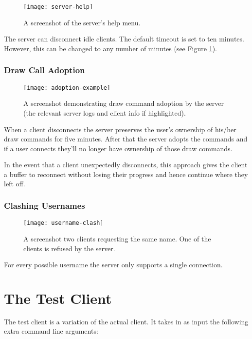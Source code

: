 \documentclass[article]{uom-coursework}
\begin{document}
\begin{figure}[H]
\centering
\texttt{[image: server-help]}
\caption{A screenshot of the server's help menu.}
\label{fig:serverhelp}
\end{figure}

The server can disconnect idle clients. The default timeout is
set to ten minutes. However, this can be changed to any number
of minutes (see Figure \ref{fig:serverhelp}).

\subsubsection{Draw Call Adoption}

\begin{figure}[H]
\centering
\texttt{[image: adoption-example]}
\caption{A screenshot demonstrating draw command adoption by the
server (the relevant server logs and client info if
highlighted).}
\label{fig:useradoption}
\end{figure}

When a client disconnects the server preserves the user's
ownership of his/her draw commands for five minutes. After
that the server adopts the commands and if a user connects
they'll no longer have ownership of those draw commands.

In the event that a client unexpectedly disconnects, this
approach gives the client a buffer to reconnect without losing
their progress and hence continue where they left off.

\subsubsection{Clashing Usernames}

\begin{figure}[H]
\centering
\texttt{[image: username-clash]}
\caption{A screenshot two clients requesting the same name. One
of the clients is refused by the server.}
\label{fig:useradoption}
\end{figure}

For every possible username the server only supports a single
connection.

\section{The Test Client}

The test client is a variation of the actual client. It
takes in as input the following extra command line arguments:
\end{document}
